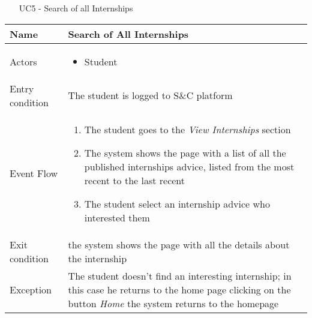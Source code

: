 				\begin{table} [H]
					\centering
					\begin{itemize}
						\item [UC5] - Search of all Internships
					\end{itemize}
					\begin{tabular}{|| P{7.5cm} | P{7.5cm} ||}
						\hline
						Name & Search of All Internships \\
						\hline
						Actors & \parbox{5cm}{\begin{itemize}
								\item Student
							\end{itemize}
						} \\
						\hline
						Entry condition & The student is logged to S\&C platform  \\
						\hline
						Event Flow & \parbox{5cm}{\begin{enumerate}[label=\alpha]
								\item The student goes to the \textit{View 
									Internships} section
								\item The system shows the page with a 
								list of all the published internships advice, 
								listed from the most recent to the 
								last recent  
								\item The student select an internship advice who interested them
						\end{enumerate}} \\
						\hline 
						Exit condition &  the system shows the 
						page with all the details about the 
						internship \\
						\hline
						Exception & The student doesn’t find an interesting 
						internship; in this case he returns to the 
						home page clicking on the button \textit{Home}
						the system returns to the homepage 
						 \\
						\hline
					\end{tabular}
				\end{table}
				
				
				
